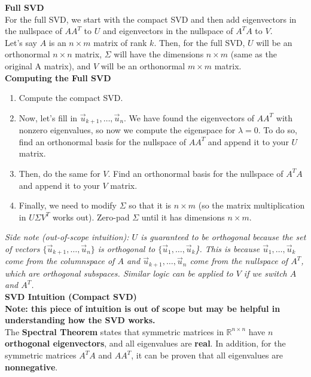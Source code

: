 \textbf{Full SVD} \\
\newline
For the full SVD, we start with the compact SVD and then add eigenvectors in the nullspace of $AA^T$ to $U$ and eigenvectors in the nullspace of $A^TA$ to $V$. \\
\newline
Let's say $A$ is an $n \times m$ matrix of rank $k$. Then, for the full SVD, $U$ will be an orthonormal $n \times n$ matrix, $\Sigma$ will have the dimensions $n \times m$ (same as the original A matrix), and $V$ will be an orthonormal $m \times m$ matrix. \\
\newline
\textbf{Computing the Full SVD}
\begin{enumerate}
    \item Compute the compact SVD.
    \item Now, let's fill in $\vec{u}_{k+1}, \dots, \vec{u}_n$. We have found the eigenvectors of $AA^T$ with nonzero eigenvalues, so now we compute the eigenspace for $\lambda = 0$. To do so, find an orthonormal basis for the nullspace of $AA^T$ and append it to your $U$ matrix.
    \item Then, do the same for $V$. Find an orthonormal basis for the nullspace of $A^T A$ and append it to your $V$ matrix.
    \item Finally, we need to modify $\Sigma$ so that it is $n \times m$ (so the matrix multiplication in $U \Sigma V^T$ works out). Zero-pad $\Sigma$ until it has dimensions $n \times m$.
\end{enumerate}
\textit{Side note (out-of-scope intuition): $U$ is guaranteed to be orthogonal because the set of vectors $\{\vec{u}_{k + 1}, \dots, \vec{u}_n\}$ is orthogonal to $\{\vec{u}_1, \dots, \vec{u}_k$\}. 
This is because $\vec{u}_1, \dots, \vec{u}_k$ come from the columnspace of $A$ and $\vec{u}_{k + 1}, \dots, \vec{u}_n$ come from the nullspace of $A^T$, which are orthogonal subspaces. 
Similar logic can be applied to $V$ if we switch $A$ and $A^T$.} \\
\newline
\textbf{SVD Intuition (Compact SVD)} \\
\textbf{Note: this piece of intuition is out of scope but may be helpful in understanding how the SVD works.} \\
\newline
The \textbf{Spectral Theorem} states that symmetric matrices in $\mathbb{R}^{n\times n}$ have $n$ \textbf{orthogonal eigenvectors}, and all eigenvalues are \textbf{real}. In addition, for the symmetric matrices $A^T A$ and $AA^T$, it can be proven that all eigenvalues are \textbf{nonnegative}. \\
